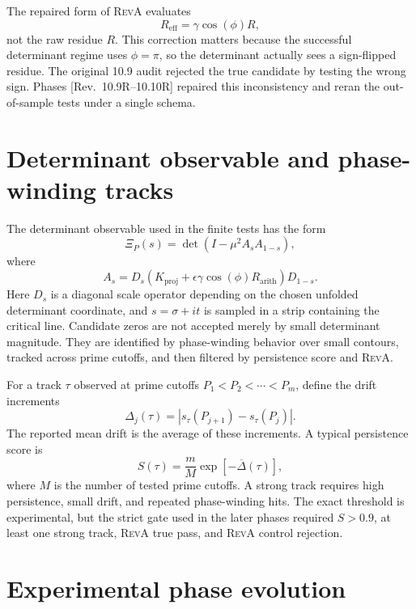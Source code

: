 \documentclass[11pt]{article}
\newcommand{\RevA}{\textsc{RevA}}
\newcommand{\Rarith}{R_{\mathrm{arith}}}
\newcommand{\Kproj}{K_{\mathrm{proj}}}
\newcommand{\revtag}[1]{\textnormal{[Rev.~#1]}}
\theoremstyle{definition}
\theoremstyle{plain}
\begin{document}
The repaired form of \RevA{} evaluates
\begin{equation}
  R_{\mathrm{eff}}=\gamma\cos(\phi)R,
\end{equation}
not the raw residue $R$.  This correction matters because the successful determinant regime uses $\phi=\pi$, so the determinant actually sees a sign-flipped residue.  The original 10.9 audit rejected the true candidate by testing the wrong sign.  Phases \revtag{10.9R--10.10R} repaired this inconsistency and reran the out-of-sample tests under a single schema.

\section{Determinant observable and phase-winding tracks}

The determinant observable used in the finite tests has the form
\begin{equation}
  \Xi_{P}(s)=\det\left(I-\mu^2A_sA_{1-s}\right),
\end{equation}
where
\begin{equation}
  A_s=D_s\left(\Kproj+\epsilon\gamma\cos(\phi)\Rarith\right)D_{1-s}.
\end{equation}
Here $D_s$ is a diagonal scale operator depending on the chosen unfolded determinant coordinate, and $s=\sigma+it$ is sampled in a strip containing the critical line.  Candidate zeros are not accepted merely by small determinant magnitude.  They are identified by phase-winding behavior over small contours, tracked across prime cutoffs, and then filtered by persistence score and \RevA{}.

For a track $\tau$ observed at prime cutoffs $P_1<P_2<\cdots<P_m$, define the drift increments
\begin{equation}
  \Delta_j(\tau)=|s_\tau(P_{j+1})-s_\tau(P_j)|.
\end{equation}
The reported mean drift is the average of these increments.  A typical persistence score is
\begin{equation}
  S(\tau)=\frac{m}{M}\exp[-\overline{\Delta}(\tau)],
\end{equation}
where $M$ is the number of tested prime cutoffs.  A strong track requires high persistence, small drift, and repeated phase-winding hits.  The exact threshold is experimental, but the strict gate used in the later phases required $S>0.9$, at least one strong track, \RevA{} true pass, and \RevA{} control rejection.

\section{Experimental phase evolution}
\end{document}
